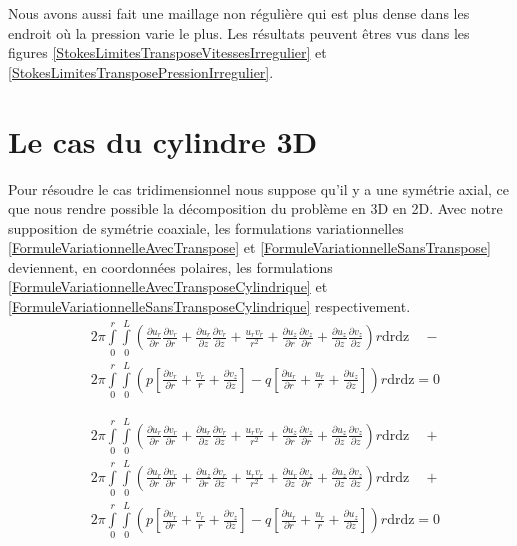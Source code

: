 \documentclass[11pt,a4paper]{article}
\numberwithin{equation}{subsection}
\numberwithin{figure}{subsection}
\begin{document}
Nous avons aussi fait une maillage non régulière qui est plus dense dans les endroit où la pression varie le plus. Les résultats peuvent êtres vus dans les figures \ref{StokesLimitesTransposeVitessesIrregulier} et \ref{StokesLimitesTransposePressionIrregulier}.

%
%
\section{Le cas du cylindre 3D}

Pour résoudre le cas tridimensionnel nous suppose qu'il y a une symétrie axial, ce que nous rendre possible la décomposition du problème en 3D en 2D. Avec notre supposition de symétrie coaxiale, les formulations variationnelles \ref{FormuleVariationnelleAvecTranspose} et \ref{FormuleVariationnelleSansTranspose} deviennent, en coordonnées polaires, les formulations \ref{FormuleVariationnelleAvecTransposeCylindrique} et \ref{FormuleVariationnelleSansTransposeCylindrique} respectivement.
\begin{equation}
\begin{aligned}
& 2\pi\int\limits_0^r\int\limits_0^L \left(\frac{\partial u_r}{\partial r}\frac{\partial v_r}{\partial r} + \frac{\partial u_r}{\partial z}\frac{\partial v_r}{\partial z} + \frac{u_rv_r}{r^2} + \frac{\partial u_z}{\partial r}\frac{\partial v_z}{\partial r} + \frac{\partial u_z}{\partial z}\frac{\partial v_z}{\partial z}\right)r\mathrm{drdz}  \quad- \\
& 2\pi\int\limits_0^r\int\limits_0^L \left(p\left[\frac{\partial v_r}{\partial r} + \frac{v_r}{r} + \frac{\partial v_z}{\partial z}\right] - q\left[\frac{\partial u_r}{\partial r} + \frac{u_r}{r} + \frac{\partial u_z}{\partial z}\right]\right) r\mathrm{drdz} = 0
\end{aligned} \label{FormuleVariationnelleSansTransposeCylindrique}
\end{equation}

\begin{equation}
\begin{aligned}
& 2\pi\int\limits_0^r\int\limits_0^L \left(\frac{\partial u_r}{\partial r}\frac{\partial v_r}{\partial r} + \frac{\partial u_r}{\partial z}\frac{\partial v_r}{\partial z} + \frac{u_rv_r}{r^2} + \frac{\partial u_z}{\partial r}\frac{\partial v_z}{\partial r} + \frac{\partial u_z}{\partial z}\frac{\partial v_z}{\partial z}\right)r\mathrm{drdz}  \quad+ \\
& 2\pi\int\limits_0^r\int\limits_0^L \left(\frac{\partial u_r}{\partial r}\frac{\partial v_r}{\partial r} + \frac{\partial u_z}{\partial r}\frac{\partial v_r}{\partial z} + \frac{u_rv_r}{r^2} + \frac{\partial u_r}{\partial z}\frac{\partial v_z}{\partial r} + \frac{\partial u_z}{\partial z}\frac{\partial v_z}{\partial z}\right)r\mathrm{drdz}  \quad+ \\
& 2\pi\int\limits_0^r\int\limits_0^L \left(p\left[\frac{\partial v_r}{\partial r} + \frac{v_r}{r} + \frac{\partial v_z}{\partial z}\right] - q\left[\frac{\partial u_r}{\partial r} + \frac{u_r}{r} + \frac{\partial u_z}{\partial z}\right]\right) r\mathrm{drdz} = 0
\end{aligned} \label{FormuleVariationnelleAvecTransposeCylindrique}
\end{equation}
\end{document}
